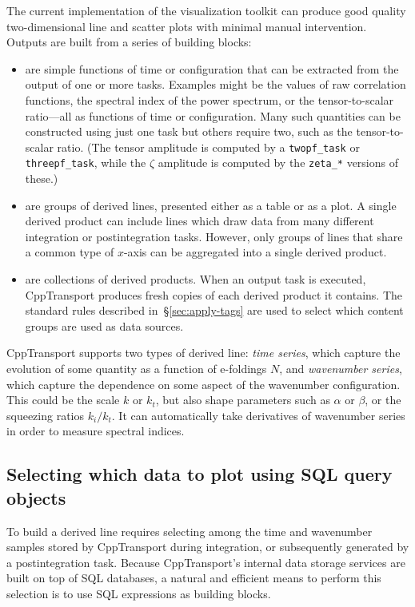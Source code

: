 \documentclass[11pt,a4paper]{article}
\newcommand{\packagefont}{\sffamily}
\newcommand{\CppTransport}{{\packagefont CppTransport}}
\newcommand{\semibold}[1]{{\fontseries{b}\selectfont{#1}}}
\begin{document}
The current implementation of the visualization toolkit can
produce
good quality two-dimensional line and scatter plots
with minimal manual intervention.
Outputs are built from a series of building blocks:
\begin{itemize}
    \item \semibold{derived \emph{lines}} are simple functions of time
    or configuration that can be extracted from the output of one or more tasks.
    Examples might be
    the values of raw correlation functions,
    the spectral index of the power spectrum,
    or the tensor-to-scalar ratio---all as functions of time or configuration.
    Many such quantities can be constructed using just one task but others require
    two, such as the tensor-to-scalar ratio.
    (The tensor amplitude is computed by
    a \texttt{twopf_task} or
    \texttt{threepf_task}, while the $\zeta$ amplitude
    is computed by the
    \texttt{zeta_*} versions of these.)
    
    \item \semibold{derived \emph{products}} are groups of derived lines,
    presented either as a table or as a plot.
    A single derived product can include lines which draw data from many different
    integration or postintegration tasks.
    However, only groups of lines that share a common type of $x$-axis can be
    aggregated into a single derived product.
    
    \item \semibold{output tasks} are collections of derived products.
    When an output task is executed, {\CppTransport}
    produces fresh copies of each derived product it contains.
    The standard rules described in~\S\ref{sec:apply-tags}
    are used to select which content groups are used as data sources.
\end{itemize}
{\CppTransport} supports two types of derived line:
\emph{time series}, which capture the evolution of some quantity as a function
of e-foldings $N$, and
\emph{wavenumber series},
which capture the dependence on some aspect of the wavenumber configuration.
This could be the scale $k$ or $k_t$, but also shape parameters such as
$\alpha$ or $\beta$, or the squeezing ratios $k_i/k_t$.
It can automatically take derivatives of wavenumber series in order to
measure spectral indices.

\subsection{Selecting which data to plot using SQL query objects}
To build a derived line requires selecting among the time and wavenumber samples
stored by {\CppTransport} during integration,
or subsequently generated by a postintegration task.
Because {\CppTransport}'s internal data storage services are built on top of
SQL databases, a natural and efficient
means to perform this selection is to use
SQL expressions as building blocks.
\end{document}
